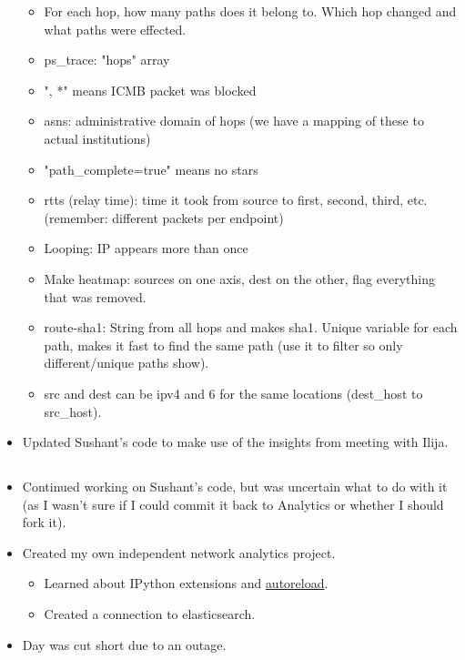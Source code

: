 \documentclass{weeklyreport}
\begin{document}
\begin{itemize}
\begin{itemize}
    	\item For each hop, how many paths does it belong to. Which hop changed and what paths were effected.
    	
    	\item ps\_trace: "hops" array
    	\item ", *" means ICMB packet was blocked
    	\item asns: administrative domain of hops (we have a mapping of these to actual institutions)
    	\item "path\_complete=true" means no stars
    	\item rtts (relay time): time it took from source to first, second, third, etc. (remember: different packets per endpoint)
    	\item Looping: IP appears more than once
    	\item Make heatmap: sources on one axis, dest on the other, flag everything that was removed.
    	\item route-sha1: String from all hops and makes sha1. Unique variable for each path, makes it fast to find the same path (use it to filter so only different/unique paths show).
    	\item src and dest can be ipv4 and 6 for the same locations (dest\_host to src\_host).
    \end{itemize}
    \item Updated Sushant's code to make use of the insights from meeting with Ilija.
\end{itemize}


\subsection*{}

\begin{itemize}
    \item Continued working on Sushant's code, but was uncertain what to do with it (as I wasn't sure if I could commit it back to Analytics or whether I should fork it).
    \item Created my own independent network analytics project.
    \begin{itemize}
    	\item Learned about IPython extensions and \href{https://switowski.com/blog/ipython-autoreload}{autoreload}.
    	\item Created a connection to elasticsearch.
    \end{itemize}
    \item Day was cut short due to an outage.
\end{itemize}
\end{document}
